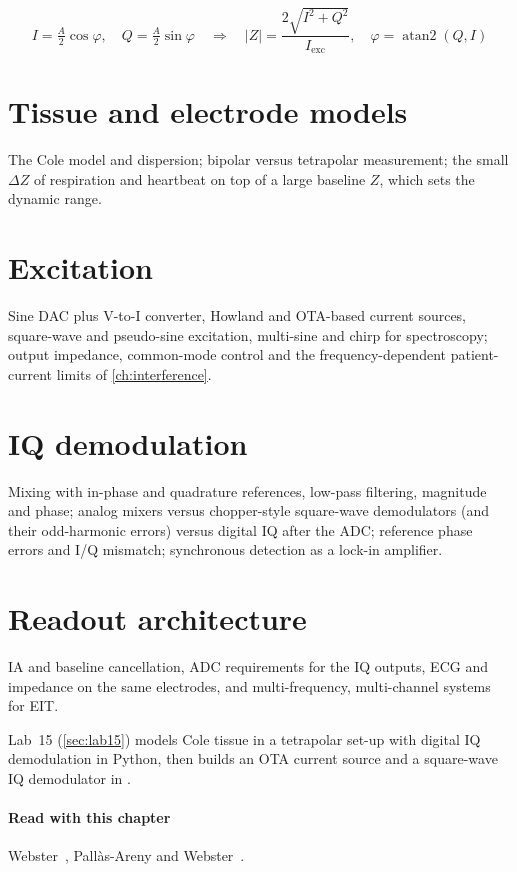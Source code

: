 \begin{keyeq}[IQ demodulation]
\begin{equation}
  I = \tfrac{A}{2}\cos\varphi,\quad Q = \tfrac{A}{2}\sin\varphi \quad\Rightarrow\quad |Z| = \frac{2\sqrt{I^2+Q^2}}{I_{\mathrm{exc}}},\quad \varphi = \operatorname{atan2}(Q, I)
  \label{eq:iq}
\end{equation}
\end{keyeq}

\section{Tissue and electrode models}\label{sec:ch28-2}
The Cole model and dispersion; bipolar versus tetrapolar measurement; the small $\Delta Z$ of respiration and heartbeat on top of a large baseline $Z$, which sets the dynamic range.

\section{Excitation}\label{sec:ch28-3}
Sine DAC plus V-to-I converter, Howland and OTA-based current sources, square-wave and pseudo-sine excitation, multi-sine and chirp for spectroscopy; output impedance, common-mode control and the frequency-dependent patient-current limits of \cref{ch:interference}.

\section{IQ demodulation}\label{sec:ch28-4}
Mixing with in-phase and quadrature references, low-pass filtering, magnitude and phase; analog mixers versus chopper-style square-wave demodulators (and their odd-harmonic errors) versus digital IQ after the ADC; reference phase errors and I/Q mismatch; synchronous detection as a lock-in amplifier.

\section{Readout architecture}\label{sec:ch28-5}
IA and baseline cancellation, ADC requirements for the IQ outputs, ECG and impedance on the same electrodes, and multi-frequency, multi-channel systems for EIT.

\begin{tryit}
Lab~15 (\cref{sec:lab15}) models Cole tissue in a tetrapolar set-up with digital IQ demodulation in Python, then builds an OTA current source and a square-wave IQ demodulator in \sgx{}.
\end{tryit}

\paragraph{Read with this chapter} Webster~\cite{webster}, Pall\`as-Areny and Webster~\cite{pallasareny}.
